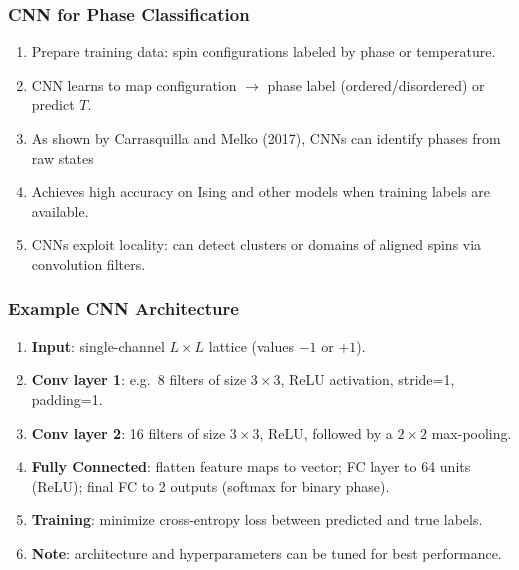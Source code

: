 \documentclass{beamer}
\begin{document}
\begin{frame}
\frametitle{CNN for Phase Classification}

\begin{enumerate}
\item Prepare training data: spin configurations labeled by phase or temperature.

\item CNN learns to map configuration $\to$ phase label (ordered/disordered) or predict $T$.

\item As shown by Carrasquilla and Melko (2017), CNNs can identify phases from raw states 

\item Achieves high accuracy on Ising and other models when training labels are available.

\item CNNs exploit locality: can detect clusters or domains of aligned spins via convolution filters.
\end{enumerate}

\noindent
\end{frame}

\begin{frame}
\frametitle{Example CNN Architecture}

\begin{enumerate}
\item \textbf{Input}: single-channel $L\times L$ lattice (values $-1$ or $+1$).

\item \textbf{Conv layer 1}: e.g.\ 8 filters of size $3\times3$, ReLU activation, stride=1, padding=1.

\item \textbf{Conv layer 2}: 16 filters of size $3\times3$, ReLU, followed by a $2\times2$ max-pooling.

\item \textbf{Fully Connected}: flatten feature maps to vector; FC layer to 64 units (ReLU); final FC to 2 outputs (softmax for binary phase).

\item \textbf{Training}: minimize cross-entropy loss between predicted and true labels.

\item \textbf{Note}: architecture and hyperparameters can be tuned for best performance.
\end{enumerate}

\noindent
\end{frame}
\end{document}
